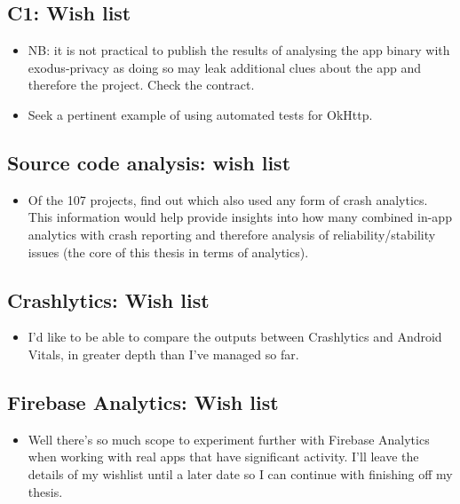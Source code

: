 \subsection*{C1: Wish list}
{\small

\begin{itemize}
    \item NB: it is not practical to publish the results of analysing the app binary with exodus-privacy as doing so may leak additional clues about the app and therefore the project. Check the contract.
    \item Seek a pertinent example of using automated tests for OkHttp.
\end{itemize}
}

\subsection{Source code analysis: wish list}
{\small
\begin{itemize}
    \item Of the 107 projects, find out which also used any form of crash analytics. This information would help provide insights into how many combined in-app analytics with crash reporting and therefore analysis of reliability/stability issues (the core of this thesis in terms of analytics).
\end{itemize}
}


\subsection*{Crashlytics: Wish list}
{\small

\begin{itemize}
    \item I'd like to be able to compare the outputs between Crashlytics and Android Vitals, in greater depth than I've managed so far.
\end{itemize}
}

\subsection*{Firebase Analytics: Wish list}
{\small

\begin{itemize}
    \item Well there's so much scope to experiment further with Firebase Analytics when working with real apps that have significant activity. I'll leave the details of my wishlist until a later date so I can continue with finishing off my thesis.
\end{itemize}
}


